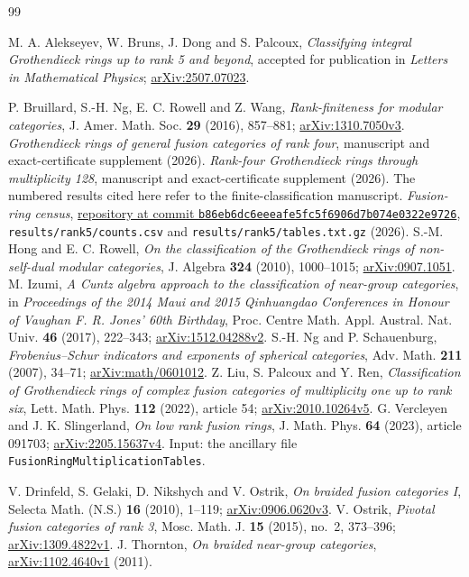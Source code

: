 \begin{thebibliography}{99}
\raggedright
\small
{} M. A. Alekseyev, W. Bruns, J. Dong and S. Palcoux,
\emph{Classifying integral Grothendieck rings up to rank 5 and beyond},
accepted for publication in \emph{Letters in Mathematical Physics};
\href{https://arxiv.org/abs/2507.07023}{arXiv:2507.07023}.

 P. Bruillard, S.-H. Ng, E. C. Rowell and Z. Wang,
\emph{Rank-finiteness for modular categories}, J. Amer. Math. Soc.
\textbf{29} (2016), 857--881;
\href{https://arxiv.org/abs/1310.7050v3}{arXiv:1310.7050v3}.
 \emph{Grothendieck rings of general fusion categories of rank four},
manuscript and exact-certificate supplement (2026).
 \emph{Rank-four Grothendieck rings through multiplicity 128},
manuscript and exact-certificate supplement (2026).
The numbered results cited here refer to the finite-classification manuscript.
 \emph{Fusion-ring census},
\href{https://github.com/sebastienpalcoux/fusion-ring-census/tree/b86eb6dc6eeeafe5fc5f6906d7b074e0322e9726}{repository at commit \texttt{b86eb6dc6eeeafe5fc5f6906d7b074e0322e9726}},
\texttt{results/rank5/counts.csv} and
\texttt{results/rank5/tables.txt.gz} (2026).
 S.-M. Hong and E. C. Rowell,
\emph{On the classification of the Grothendieck rings of non-self-dual
modular categories}, J. Algebra \textbf{324} (2010), 1000--1015;
\href{https://arxiv.org/abs/0907.1051}{arXiv:0907.1051}.
 M. Izumi,
\emph{A Cuntz algebra approach to the classification of near-group categories},
in \emph{Proceedings of the 2014 Maui and 2015 Qinhuangdao Conferences
in Honour of Vaughan F. R. Jones' 60th Birthday},
Proc. Centre Math. Appl. Austral. Nat. Univ. \textbf{46} (2017), 222--343;
\href{https://arxiv.org/abs/1512.04288v2}{arXiv:1512.04288v2}.
 S.-H. Ng and P. Schauenburg,
\emph{Frobenius--Schur indicators and exponents of spherical categories},
Adv. Math. \textbf{211} (2007), 34--71;
\href{https://arxiv.org/abs/math/0601012}{arXiv:math/0601012}.
 Z. Liu, S. Palcoux and Y. Ren,
\emph{Classification of Grothendieck rings of complex fusion categories
of multiplicity one up to rank six}, Lett. Math. Phys. \textbf{112}
(2022), article 54;
\href{https://arxiv.org/abs/2010.10264v5}{arXiv:2010.10264v5}.
 G. Vercleyen and J. K. Slingerland,
\emph{On low rank fusion rings}, J. Math. Phys. \textbf{64} (2023),
article 091703;
\href{https://arxiv.org/abs/2205.15637v4}{arXiv:2205.15637v4}.
Input: the ancillary file \texttt{FusionRingMultiplicationTables}.

 V. Drinfeld, S. Gelaki, D. Nikshych and V. Ostrik,
\emph{On braided fusion categories I}, Selecta Math. (N.S.)
\textbf{16} (2010), 1--119;
\href{https://arxiv.org/abs/0906.0620v3}{arXiv:0906.0620v3}.
 V. Ostrik,
\emph{Pivotal fusion categories of rank 3}, Mosc. Math. J.
\textbf{15} (2015), no.~2, 373--396;
\href{https://arxiv.org/abs/1309.4822v1}{arXiv:1309.4822v1}.
 J. Thornton, \emph{On braided near-group categories},
\href{https://arxiv.org/abs/1102.4640v1}{arXiv:1102.4640v1} (2011).
\end{thebibliography}
